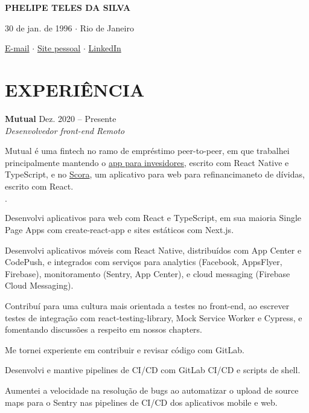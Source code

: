 \documentclass[12pt]{article}
\newenvironment{tightlist}
  {\begin{list}
    {$\cdot$}
    {
      \setlength{\leftmargin}{0em}
      \setlength{\itemsep}{\smallskipamount}
    }
  }
{\end{list}}
\begin{document}
\pagestyle{empty}

\centerline{\huge\bf PHELIPE TELES DA SILVA}
\medskip

\centerline{30 de jan. de 1996 $\cdot$ Rio de Janeiro}
\smallskip

\centerline{
  \href{mailto:telesphelipe@gmail.com}{E-mail}
  $\cdot$
  \href{https://phelipetls.github.io}{Site pessoal}
  $\cdot$
  \href{https://linkedin.com/in/phelipeteles}{LinkedIn}
}
\smallskip

\section*{EXPERIÊNCIA}

\textbf{Mutual} \hfill Dez. 2020 -- Presente \\
\textit{Desenvolvedor front-end} \hfill \textit{Remoto} {\parfillskip=0pt\par}

Mutual é uma fintech no ramo de empréstimo peer-to-peer, em que trabalhei
principalmente mantendo o \href{https://mutual.club/en/invest.html}{app para
invesidores}, escrito com React Native e TypeScript, e no
\href{https://scora.com.br/}{Scora}, um aplicativo para web para refinancimaneto
de dívidas, escrito com React.

\medskip

\begin{tightlist}
  \item Desenvolvi aplicativos para web com React e TypeScript, em sua maioria
    Single Page Apps com create-react-app e sites estáticos com Next.js.
  \item Desenvolvi aplicativos móveis com React Native, distribuídos com App
    Center e CodePush, e integrados com serviços para analytics (Facebook,
    AppsFlyer, Firebase), monitoramento (Sentry, App Center), e cloud messaging
    (Firebase Cloud Messaging).
  \item Contribuí para uma cultura mais orientada a testes no front-end, ao
    escrever testes de integração com react-testing-library, Mock Service Worker
    e Cypress, e fomentando discussões a respeito em nossos chapters.
  \item Me tornei experiente em contribuir e revisar código com GitLab.
  \item Desenvolvi e mantive pipelines de CI/CD com GitLab CI/CD e scripts de
    shell.
  \item Aumentei a velocidade na resolução de bugs ao automatizar o upload de
    source maps para o Sentry nas pipelines de CI/CD dos aplicativos mobile e
    web.
\end{tightlist}
\end{document}
